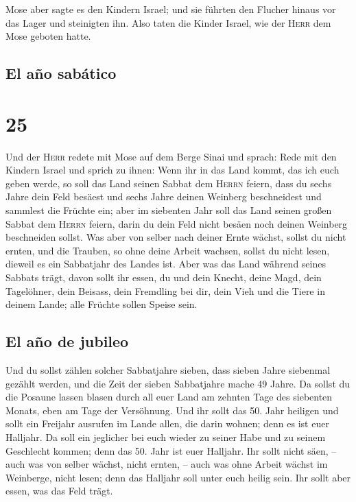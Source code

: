  Mose aber sagte es den Kindern Israel; und sie führten
den Flucher hinaus vor das Lager und steinigten ihn. Also taten die
Kinder Israel, wie der \textsc{Herr} dem Mose geboten hatte.

\hypertarget{el-auxf1o-sabuxe1tico}{%
\subsection{El año sabático}\label{el-auxf1o-sabuxe1tico}}

\hypertarget{section-24}{%
\section{25}\label{section-24}}

 Und der \textsc{Herr} redete mit Mose auf dem Berge Sinai
und sprach:  Rede mit den Kindern Israel und sprich zu
ihnen: Wenn ihr in das Land kommt, das ich euch geben werde, so soll das
Land seinen Sabbat dem \textsc{Herrn} feiern,  dass du
sechs Jahre dein Feld besäest und sechs Jahre deinen Weinberg
beschneidest und sammlest die Früchte ein;  aber im
siebenten Jahr soll das Land seinen großen Sabbat dem \textsc{Herrn}
feiern, darin du dein Feld nicht besäen noch deinen Weinberg beschneiden
sollst.  Was aber von selber nach deiner Ernte wächst,
sollst du nicht ernten, und die Trauben, so ohne deine Arbeit wachsen,
sollst du nicht lesen, dieweil es ein Sabbatjahr des Landes ist.
 Aber was das Land während seines Sabbats trägt, davon
sollt ihr essen, du und dein Knecht, deine Magd, dein Tagelöhner, dein
Beisass, dein Fremdling bei dir,  dein Vieh und die Tiere
in deinem Lande; alle Früchte sollen Speise sein.

\hypertarget{el-auxf1o-de-jubileo}{%
\subsection{El año de jubileo}\label{el-auxf1o-de-jubileo}}

 Und du sollst zählen solcher Sabbatjahre sieben, dass
sieben Jahre siebenmal gezählt werden, und die Zeit der sieben
Sabbatjahre mache 49 Jahre.  Da sollst du die Posaune
lassen blasen durch all euer Land am zehnten Tage des siebenten Monats,
eben am Tage der Versöhnung.  Und ihr sollt das 50. Jahr
heiligen und sollt ein Freijahr ausrufen im Lande allen, die darin
wohnen; denn es ist euer Halljahr. Da soll ein jeglicher bei euch wieder
zu seiner Habe und zu seinem Geschlecht kommen;  denn das
50. Jahr ist euer Halljahr. Ihr sollt nicht säen, -- auch was von selber
wächst, nicht ernten, -- auch was ohne Arbeit wächst im Weinberge, nicht
lesen;  denn das Halljahr soll unter euch heilig sein.
Ihr sollt aber essen, was das Feld trägt.

